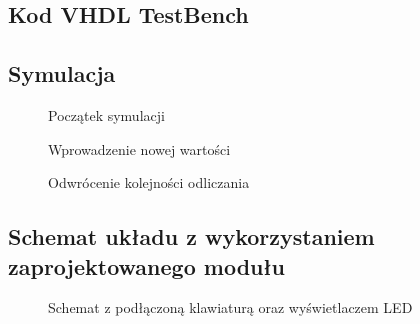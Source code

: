 \documentclass[a4paper,12pt]{extarticle}  %
\begin{document}
\subsection{Kod VHDL TestBench}


\subsection{Symulacja}
\begin{figure}[H]
   \centering
   \caption{Początek symulacji}
\end{figure}
\begin{figure}[H]
	\centering
	\caption{Wprowadzenie nowej wartości}
 \end{figure}
 \begin{figure}[H]
	\centering
	\caption{Odwrócenie kolejności odliczania}
 \end{figure}
 \subsection{Schemat układu z wykorzystaniem zaprojektowanego modułu}
 \begin{figure}[H]
	 \centering
	 \caption{Schemat z podłączoną klawiaturą oraz wyświetlaczem LED}
  \end{figure}
\end{document}

